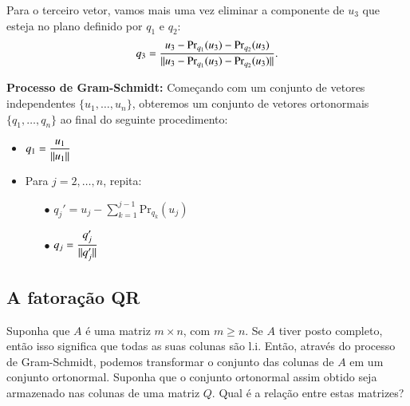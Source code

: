 Para o terceiro vetor, vamos mais uma vez eliminar a componente de $u_3$ que esteja no plano definido por $q_1$ e $q_2$:
\begin{equation*}
  q_3 = \frac{u_3 - \text{Pr}_{q_1}(u_3)-\text{Pr}_{q_2}(u_3)}{\| u_3 - \text{Pr}_{q_1}(u_3)-\text{Pr}_{q_2}(u_3) \|}.
\end{equation*}

{\bf{Processo de Gram-Schmidt:}} Começando com um conjunto de vetores independentes $\{u_1,\ldots,u_n\}$, obteremos um conjunto de vetores ortonormais $\{q_1,\ldots,q_n\}$ ao final do seguinte procedimento:
\begin{itemize}
	\item $q_1 = \dfrac{u_1}{\| u_1 \|}$
    \item Para $j=2,\ldots,n$, repita:
    \begin{itemize}
    	\item[$\bullet$] $q_j' = u_j-\sum_{k=1}^{j-1}\text{Pr}_{q_k}(u_j)$
        \item[$\bullet$] $q_j = \dfrac{q_j'}{\| q_j' \|}$
    \end{itemize}
\end{itemize}

\subsection{A fatoração QR}

Suponha que $A$ é uma matriz $m\times n$, com $m\geq n$. Se $A$ tiver posto completo, então isso significa que todas as suas colunas são l.i. Então, através do processo de Gram-Schmidt, podemos transformar o conjunto das colunas de $A$ em um conjunto ortonormal. Suponha que o conjunto ortonormal assim obtido seja armazenado nas colunas de uma matriz $Q$. Qual é a relação entre estas matrizes?


